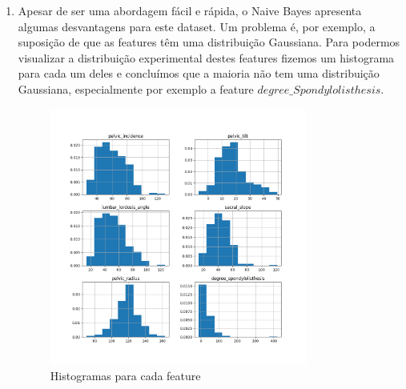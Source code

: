 \documentclass[a4paper,12pt]{article} %
\begin{document}
\begin{enumerate}
\begin{lstlisting}[language=Python]
#Calculate the difference between the two confusion matrices
conf_matrix_diff = cum_conf_matrix1 - cum_conf_matrix5

confusion1 = pd.DataFrame(conf_matrix_diff, index=knn1.classes_, columns=['Predicted Hernia', 'Predicted Normal', 'Predicted Spondylolisthesis'])

#Plotting 
plt.figure(figsize=(10, 5))
heatmap = plt.imshow(conf_matrix_diff,cmap="coolwarm", interpolation='nearest')
plt.title('Differences between the two cumulative confusion matrices (k1 - k5)')
plt.xlabel('Predicted label')
plt.xticks([0, 1, 2], ['Hernia', 'Normal', 'Spondylolisthesis'])
plt.yticks([0, 1, 2], ['Hernia', 'Normal', 'Spondylolisthesis'])
plt.ylabel('True label')
cbar = plt.colorbar(heatmap)
cbar.set_label('Difference Magnitude', rotation=90)
for i in range(conf_matrix_diff.shape[0]):
    for j in range(conf_matrix_diff.shape[1]):
        plt.text(j, i, str(int(conf_matrix_diff[i, j])), ha='center', va='center', color='black')
plt.savefig('ex2_cummatrix.png')
plt.show()
    \end{lstlisting}
    
\item Apesar de ser uma abordagem fácil e rápida, o Naive Bayes apresenta algumas desvantagens para este dataset. 
Um problema é, por exemplo, a suposição de que as features têm uma distribuição Gaussiana. Para podermos visualizar a distribuição
experimental destes features fizemos um histograma para cada um deles e concluímos que a maioria não tem uma distribuição Gaussiana, especialmente por exemplo a feature $degree\_Spondylolisthesis$.

\begin{figure}[H]
    \centering
    \includegraphics[width=0.8\textwidth]{ex3_1_hist.png}
    \caption{Histogramas para cada feature}
    \label{fig:ex3_histograms}
\end{figure}


\end{enumerate}
\end{document}
